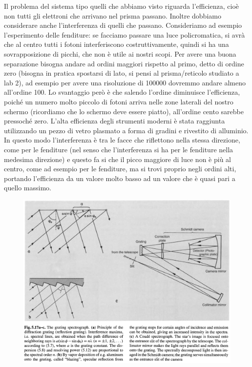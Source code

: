 Il problema del sistema tipo quelli che abbiamo visto riguarda l'efficienza, cioè non tutti gli elettroni che arrivano nel prisma passano. Inoltre dobbiamo considerare anche l'interferenza di quelli che passano. Consideriamo ad esempio l'esperimento delle fenditure: se facciamo passare una luce policromatica, si avrà che al centro tutti i fotoni interferiscono costruttivamente, quindi si ha una sovrapposizione di picchi, che non è utile ai nostri scopi. Per avere una buona separazione bisogna andare ad ordini maggiori rispetto al primo, detto di ordine zero (bisogna in pratica spostarsi di lato, si pensi al prisma/reticolo studiato a lab 2), ad esempio per avere una risoluzione di 100000 dovremmo andare almeno all'ordine 100. Lo svantaggio però è che salendo l'ordine diminuisce l'efficienza, poiché un numero molto piccolo di fotoni arriva nelle zone laterali del nostro schermo (ricordiamo che lo schermo deve essere piatto), all'ordine cento sarebbe pressoché zero. L'alta efficienza degli strumenti moderni è stata raggiunta utilizzando un pezzo di vetro plasmato a forma di gradini e rivestito di alluminio. In questo modo l'interferenza è tra le facce che riflettono nella stessa direzione, come per le fenditure (nel senso che l'interferenza si ha per le fenditure nella medesima direzione) e questo fa si che il picco maggiore di luce non è più al centro, come ad esempio per le fenditure, ma si trovi proprio negli ordini alti, portando l'efficienza da un valore molto basso ad un valore che è quasi pari a quello massimo.

\begin{figure}[H]
  \centering
  \includegraphics[width=\textwidth]{immagini/spettrografo_a_gradino.png}
\end{figure}


